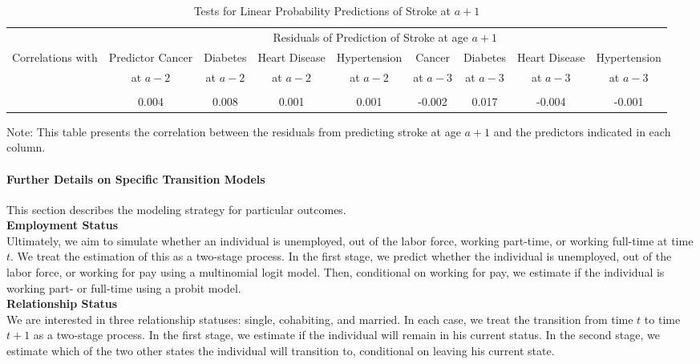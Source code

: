 \begin{landscape}
\begin{table}[H]
\begin{threeparttable}
\caption{Tests for Linear Probability Predictions of Stroke at $a+1$} \label{table:1storderresidstroke}
\centering
\footnotesize
\begin{tabular}{l *{8}{c}}
\toprule
& \multicolumn{8}{c}{Residuals of Prediction of Stroke at age $a+1$} \\
Correlations with	&	Predictor Cancer &	Diabetes & Heart Disease &	Hypertension &	Cancer	& Diabetes & Heart Disease & Hypertension  \\
                    &	at $a-2$	&	at $a - 2$ & at $a - 2$	& at $a - 2$	& at $a-3$	& at $a - 3$	& at $a - 3$	& at $a - 3$ \\
\midrule \\
&	0.004 &	0.008	&	0.001	&	0.001	&	-0.002	&	0.017 &	-0.004 &	-0.001	\\
\bottomrule
\end{tabular}
\begin{tablenotes}
\footnotesize
\item Note: This table presents the correlation between the residuals from predicting stroke at age $a+1$ and the predictors indicated in each column.
\end{tablenotes}
\end{threeparttable}
\end{table}

\end{landscape}

\paragraph{Further Details on Specific Transition Models}
\noindent This section describes the modeling strategy for particular outcomes. \\

\noindent \textbf{Employment Status}\\
\noindent Ultimately, we aim to simulate whether an individual is unemployed, out of the labor force, working part-time, or working full-time at
time $t$. We treat the estimation of this as a two-stage process. In the first stage, we predict whether the individual is unemployed, out of
the labor force, or working for pay using a multinomial logit model. Then, conditional on working for pay, we estimate if
the individual is working part- or full-time using a probit model. \\

\noindent \textbf{Relationship Status}\\
\noindent We are interested in three relationship statuses: single, cohabiting, and married. In each case, we treat the transition
from time $t$ to time $t+1$ as a two-stage process. In the first stage, we estimate if the individual will remain in his
current status. In the second stage, we estimate which of the two other states the individual will transition to, conditional
on leaving his current state. \\

